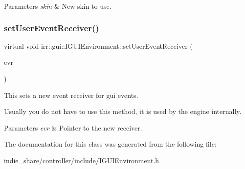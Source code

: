 \begin{DoxyParams}{Parameters}
{\em skin} & New skin to use. \\
\hline
\end{DoxyParams}
\mbox{\label{classirr_1_1gui_1_1IGUIEnvironment_a2491715aa30894c66357eb0451aa10b0}} 
\subsubsection{\texorpdfstring{set\+User\+Event\+Receiver()}{setUserEventReceiver()}}
{\footnotesize\ttfamily virtual void irr\+::gui\+::\+I\+G\+U\+I\+Environment\+::set\+User\+Event\+Receiver (\begin{DoxyParamCaption}\item[{\hyperlink{classirr_1_1IEventReceiver}{I\+Event\+Receiver} $\ast$}]{evr }\end{DoxyParamCaption})\hspace{0.3cm}{\ttfamily [pure virtual]}}



This sets a new event receiver for gui events. 

Usually you do not have to use this method, it is used by the engine internally. 
\begin{DoxyParams}{Parameters}
{\em evr} & Pointer to the new receiver. \\
\hline
\end{DoxyParams}


The documentation for this class was generated from the following file\+:\begin{DoxyCompactItemize}
\item 
indie\+\_\+share/controller/include/I\+G\+U\+I\+Environment.\+h\end{DoxyCompactItemize}
